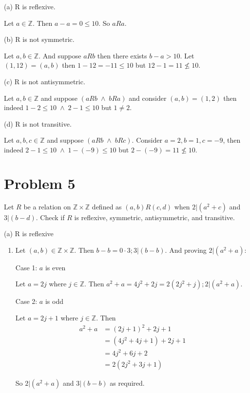 \documentclass{article}
\begin{document}
    (a) R is reflexive.
    
    \quad Let $a\in \mathbb{Z}$. Then $a-a = 0\leq 10$. So $aRa$.

    (b) R is not symmetric. 

    \quad Let $a,b\in \mathbb{Z}$. And suppose $aRb$ then there exists $b - a > 10$. 
    Let $(1,12) = (a,b)$ then $1-12 = -11 \leq 10$ but $12 - 1 = 11 \nleq 10$.

    (c) R is not antisymmetric.
    
    \quad Let $a,b\in \mathbb{Z}$ and suppose $(aRb\; \land\; bRa)$ and consider $(a,b)=(1,2)$ then
    indeed $1-2 \leq 10\; \land\; 2-1 \leq 10$ but $1\neq 2$.

    (d) R is not transitive.

    \quad Let $a,b,c\in \mathbb{Z}$ and suppose $(aRb\;\land\; bRc)$. Consider $a = 2, b = 1, c = -9$,
    then indeed $2-1\leq 10\;\land\; 1-(-9)\leq 10$ but $2-(-9) = 11 \nleq 10$.



    \section*{Problem 5}

    Let $R$ be a relation on $\mathbb{Z}\times \mathbb{Z}$ defined as $(a,b)R(c,d)$ when $2|(a^2+c)$ and
    $3|(b-d)$. Check if $R$ is reflexive, symmetric, antisymmetric, and transitive.

    (a) R is reflexive
    \begin{enumerate}[label=\quad\quad, leftmargin=*]
        \item 
        Let $(a,b)\in \mathbb{Z}\times \mathbb{Z}$. Then $b-b = 0\cdot 3; 3|(b-b)$. And proving $2|(a^2+a)$:

        Case 1: $a$ is even 

        \quad Let $a = 2j$ where $j\in \mathbb{Z}$. Then $a^2+a = 4j^2+2j = 2(2j^2+j); 2|(a^2+a)$.

        Case 2: $a$ is odd 

        \quad Let $a = 2j +1$ where $j\in \mathbb{Z}$. Then 
        \begin{align*}
            a^2+a &= (2j+1)^2+2j+1 \\
            & = (4j^2+4j+1) + 2j + 1 \\
            & = 4j^2+6j+2 \\
            & = 2(2j^2+3j+1)
        \end{align*}

        So $2|(a^2+a)$ and $3|(b-b)$ as required.
    \end{enumerate}
\end{document}
